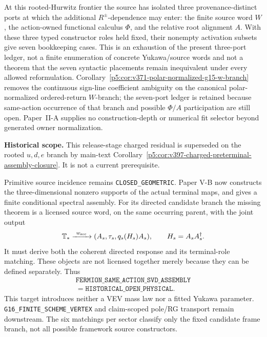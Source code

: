 \documentclass[11pt,a4paper]{article}
\begin{document}
\begin{remark}
\label{p5:rem:v370-g15-port-activation-ledger}
At this rooted-Hurwitz frontier the source has isolated three
provenance-distinct ports at which the additional \(R^\pm\)-dependence may
enter: the finite source word \(W\), the action-owned functional calculus
\(\Phi\), and the relative root alignment \(A\).  With these three typed
constructor roles held fixed, their nonempty activation subsets give seven
bookkeeping cases.  This is an exhaustion of the present three-port ledger,
not a finite enumeration of concrete Yukawa/source words and not a theorem
that the seven syntactic placements remain inequivalent under every allowed
reformulation.  Corollary~\ref{p5:cor:v371-polar-normalized-g15-w-branch}
removes the continuous sign-line coefficient ambiguity on the canonical
polar-normalized ordered-return \(W\)-branch; the seven-port ledger is retained
because same-action occurrence of that branch and possible \(\Phi/A\)
participation are still open.  Paper~II-A supplies no construction-depth or
numerical fit selector beyond generated owner normalization.
\end{remark}

\begin{remark}
\label{p5:rem:v393-assembly-boundary}
\noindent\textbf{Historical scope.} This release-stage charged residual is superseded on the rooted $u,d,e$ branch by main-text Corollary~\ref{p5:cor:v397-charged-preterminal-assembly-closure}. It is not a current prerequisite.

Primitive source incidence remains \texttt{CLOSED\_GEOMETRIC}.
Paper V-B now constructs the three-dimensional nonzero supports of the
actual terminal maps, and gives a finite conditional spectral assembly.
For its directed candidate branch the missing theorem is a licensed source
word, on the same occurring parent, with the joint output
\[
 \mathbb T_*\xrightarrow{\ w_{\rm src}\ }
 (A_s,\tau_s,q_s(H_s)A_s),\qquad H_s=A_sA_s^\dagger.
\]
It must derive both the coherent directed response and its terminal-role
matching. These objects are not licensed together merely because they can
be defined separately. Thus
\[
\begin{gathered}
 \texttt{FERMION\_SAME\_ACTION\_SVD\_ASSEMBLY}\\
 =\texttt{HISTORICAL\_OPEN\_PHYSICAL}.
\end{gathered}
\]
This target introduces neither a VEV mass law nor a fitted Yukawa parameter.
\texttt{G16\_FINITE\_\allowbreak SCHEME\_\allowbreak VERTEX} and claim-scoped pole/RG transport remain
downstream. The six matchings per sector classify only the fixed candidate
frame branch, not all possible framework source constructors.
\end{remark}
\end{document}
